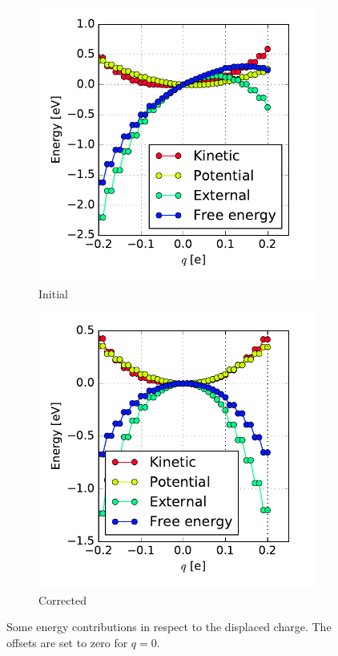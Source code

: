 \begin{figure}
	\centering
	\begin{subfigure}{0.45\textwidth}
		\centering
		\includegraphics[width = \textwidth]{Images/Hydrogen/charging/energy_contributions_asymmetric}
		\caption{Initial}
		\label{image_contributions_initial}
	\end{subfigure}\hspace*{1cm}
	\begin{subfigure}{0.45\textwidth}
		\centering
		\includegraphics[width = \textwidth]{Images/Hydrogen/charging/energy_contributions_symmetric}
		\caption{Corrected}
		\label{image_contributions_corrected}
	\end{subfigure}
	\caption{Some energy contributions in respect to the displaced charge. The offsets are set to zero for $q=0$.}
\end{figure}
